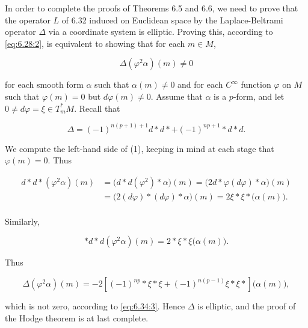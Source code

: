 \label{thm:6.35} In order to complete the proofs of Theorems 6.5 and 6.6, we need to prove that the operator $L$ of 6.32 induced on Euclidean space by the Laplace-Beltrami operator $\Delta$ via a coordinate system is elliptic. Proving this, according to \eqref{eq:6.28:2}, is equivalent to showing that for each $m \in M$,

\begin{equation}
\tag{1}\label{eq:6.35:1}
\Delta(\varphi^{2}\alpha)(m)\neq0
\end{equation}

for each smooth form $\alpha$ such that $\alpha(m) \neq 0$ and for each $C^\infty$ function $\varphi$ on $M$ such that $\varphi(m) = 0$ but $d\varphi(m) \neq 0$. Assume that $\alpha$ is a $p$-form, and let $0 \neq d\varphi = \xi \in T_{m}^{*} M$. Recall that

\[
\Delta=(-1)^{n(p+1)+1}d{\ast}d{\ast}+(-1)^{np+1}{\ast}d{\ast}d.
\]

We compute the left-hand side of (1), keeping in mind at each stage that  $ \varphi(m) = 0 $. Thus

\[
\begin{aligned}{d{*}d{*}(\varphi^{2}\alpha)(m)}&{{}=\big(d{*}d(\varphi^{2}){*}\alpha\big)(m)=\big(2d{*}\varphi(d\varphi){*}\alpha\big)(m)}\\ {}&{{}=\big(2(d\varphi){*}(d\varphi){*}\alpha\big)(m)=2\xi{*}\xi{*}\big(\alpha(m)\big).}\\ \end{aligned}
\]

Similarly,

\[
*d*d(\varphi^{2}\alpha)(m)=2*\xi*\xi\bigl(\alpha(m)\bigr).
\]

Thus

\[
\Delta(\varphi^{2}\alpha)(m)=-2[(-1)^{n p}\ast\xi\ast\xi+(-1)^{n(p-1)}\xi\ast\xi\ast]\bigl(\alpha(m)\bigr),
\]

which is not zero, according to \eqref{eq:6.34:3}. Hence $\Delta$ is elliptic, and the proof of the Hodge theorem is at last complete.

